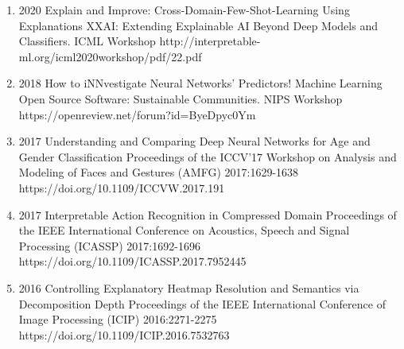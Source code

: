 {\begin{enumerate}
        \item {}
                                {2020}
                                {Explain and Improve: Cross-Domain-Few-Shot-Learning Using Explanations}
                                {XXAI: Extending Explainable AI Beyond Deep Models and Classifiers. ICML Workshop}
                                {}
                                {http://interpretable-ml.org/icml2020workshop/pdf/22.pdf}


        \item {}
                                {2018}
                                {How to iNNvestigate Neural Networks' Predictors!}
                                {Machine Learning Open Source Software: Sustainable Communities. NIPS Workshop}
                                {}
                                {https://openreview.net/forum?id=ByeDpyc0Ym}


        \item {}
                                {2017}
                                {Understanding and Comparing Deep Neural Networks for Age and Gender Classification}
                                {Proceedings of the ICCV'17 Workshop on Analysis and Modeling of Faces and Gestures (AMFG)}
                                {2017:1629-1638}
                                {https://doi.org/10.1109/ICCVW.2017.191}

        \item {}
                                {2017}
                                {Interpretable Action Recognition in Compressed Domain}
                                {Proceedings of the IEEE International Conference on Acoustics, Speech and Signal Processing (ICASSP)}
                                {2017:1692-1696}
                                {https://doi.org/10.1109/ICASSP.2017.7952445}


        \item {}
                                {2016}
                                {Controlling Explanatory Heatmap Resolution and Semantics via Decomposition Depth}
                                {Proceedings of the IEEE International Conference of Image Processing (ICIP)}
                                {2016:2271-2275}
                                {https://doi.org/10.1109/ICIP.2016.7532763}



\end{enumerate}}
